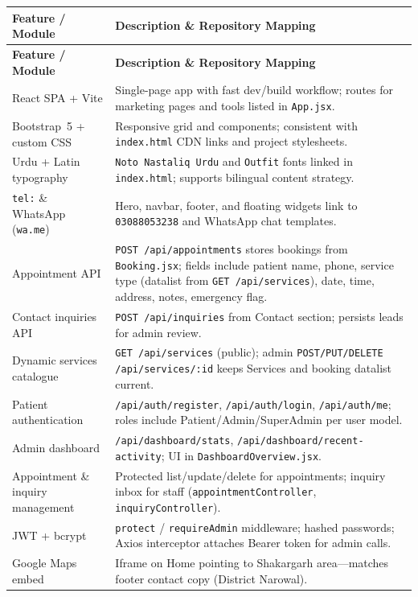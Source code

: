 \documentclass[12pt, a4paper]{article}
\begin{document}
\begin{longtable}{@{} L{4.5cm} L{9.9cm} @{}}
\toprule
\textbf{Feature / Module} & \textbf{Description \& Repository Mapping} \\
\midrule
\endfirsthead
\toprule
\textbf{Feature / Module} & \textbf{Description \& Repository Mapping} \\
\midrule
\endhead
React SPA + Vite &
Single-page app with fast dev/build workflow; routes for marketing pages and tools listed in \texttt{App.jsx}. \\[6pt]
Bootstrap~5 + custom CSS &
Responsive grid and components; consistent with \texttt{index.html} CDN links and project stylesheets. \\[6pt]
Urdu + Latin typography &
\texttt{Noto Nastaliq Urdu} and \texttt{Outfit} fonts linked in \texttt{index.html}; supports bilingual content strategy. \\[6pt]
\texttt{tel:} \& WhatsApp (\texttt{wa.me}) &
Hero, navbar, footer, and floating widgets link to \texttt{03088053238} and WhatsApp chat templates. \\[6pt]
Appointment API &
\texttt{POST /api/appointments} stores bookings from \texttt{Booking.jsx}; fields include patient name, phone, service type (datalist from \texttt{GET /api/services}), date, time, address, notes, emergency flag. \\[6pt]
Contact inquiries API &
\texttt{POST /api/inquiries} from Contact section; persists leads for admin review. \\[6pt]
Dynamic services catalogue &
\texttt{GET /api/services} (public); admin \texttt{POST/PUT/DELETE /api/services/:id} keeps Services and booking datalist current. \\[6pt]
Patient authentication &
\texttt{/api/auth/register}, \texttt{/api/auth/login}, \texttt{/api/auth/me}; roles include Patient/Admin/SuperAdmin per user model. \\[6pt]
Admin dashboard &
\texttt{/api/dashboard/stats}, \texttt{/api/dashboard/recent-activity}; UI in \texttt{DashboardOverview.jsx}. \\[6pt]
Appointment \& inquiry management &
Protected list/update/delete for appointments; inquiry inbox for staff (\texttt{appointmentController}, \texttt{inquiryController}). \\[6pt]
JWT + bcrypt &
\texttt{protect} / \texttt{requireAdmin} middleware; hashed passwords; Axios interceptor attaches Bearer token for admin calls. \\[6pt]
Google Maps embed &
Iframe on Home pointing to Shakargarh area---matches footer contact copy (District Narowal). \\[6pt]

\end{longtable}
\end{document}
